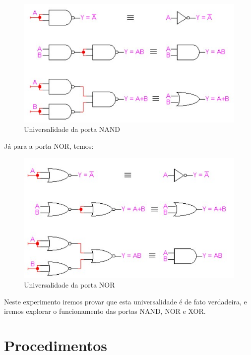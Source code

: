 \documentclass[12pt]{article}
\begin{document}
\begin{figure}[H]
	\centering
	\includegraphics[width=.5\textwidth]{portanand.jpg}
	\caption{Universalidade da porta NAND}
	\label{fig:exemplo}
\end{figure}

Já para a porta NOR, temos:

\begin{figure}[H]
	\centering
	\includegraphics[width=.5\textwidth]{portanor.jpg}
	\caption{Universalidade da porta NOR}
	\label{fig:exemplo}
\end{figure}

Neste experimento iremos provar que esta universalidade é de fato verdadeira, e iremos explorar o funcionamento das portas NAND, NOR e XOR.



\section{Procedimentos}
\label{sec:Procedimentos}
\end{document}
